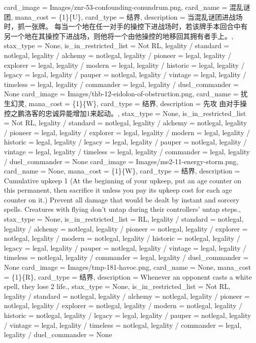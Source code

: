 \documentclass[lang = cn, color = black, 10pt]{AllThatStax}
\begin{document}
\card
{
	card_image = Images/znr-53-confounding-conundrum.png,
	card_name = 混乱谜团,
	mana_cost = \{1\}\{U\},
	card_type = 结界,
	description = 当混乱谜团进战场时，抓一张牌。
	每当一个地在任一对手的操控下进战场时，若该牌手本回合中有另一个地在其操控下进战场，则他将一个由他操控的地移回其拥有者手上。,
	stax_type = None,
	is_in_restricted_list = Not RL,
	legality / standard = notlegal,
	legality / alchemy = notlegal,
	legality / pioneer = legal,
	legality / explorer = legal,
	legality / modern = legal,
	legality / historic = legal,
	legality / legacy = legal,
	legality / pauper = notlegal,
	legality / vintage = legal,
	legality / timeless = legal,
	legality / commander = legal,
	legality / duel_commander = None
}
\card
{
	card_image = Images/thb-12-eidolon-of-obstruction.png,
	card_name = 扰生幻灵,
	mana_cost = \{1\}\{W\},
	card_type = 结界,
	description = 先攻
	由对手操控之鹏洛客的忠诚异能增加{1}来起动。,
	stax_type = None,
	is_in_restricted_list = Not RL,
	legality / standard = notlegal,
	legality / alchemy = notlegal,
	legality / pioneer = legal,
	legality / explorer = legal,
	legality / modern = legal,
	legality / historic = legal,
	legality / legacy = legal,
	legality / pauper = notlegal,
	legality / vintage = legal,
	legality / timeless = legal,
	legality / commander = legal,
	legality / duel_commander = None
}
\card
{
	card_image = Images/me2-11-energy-storm.png,
	card_name = None,
	mana_cost = \{1\}\{W\},
	card_type = 结界,
	description = Cumulative upkeep {1} (At the beginning of your upkeep, put an age counter on this permanent, then sacrifice it unless you pay its upkeep cost for each age counter on it.)
	Prevent all damage that would be dealt by instant and sorcery spells.
	Creatures with flying don't untap during their controllers' untap steps.,
	stax_type = None,
	is_in_restricted_list = RL,
	legality / standard = notlegal,
	legality / alchemy = notlegal,
	legality / pioneer = notlegal,
	legality / explorer = notlegal,
	legality / modern = notlegal,
	legality / historic = notlegal,
	legality / legacy = legal,
	legality / pauper = notlegal,
	legality / vintage = legal,
	legality / timeless = notlegal,
	legality / commander = legal,
	legality / duel_commander = None
}
\card
{
	card_image = Images/tmp-181-havoc.png,
	card_name = None,
	mana_cost = \{1\}\{R\},
	card_type = 结界,
	description = Whenever an opponent casts a white spell, they lose 2 life.,
	stax_type = None,
	is_in_restricted_list = Not RL,
	legality / standard = notlegal,
	legality / alchemy = notlegal,
	legality / pioneer = notlegal,
	legality / explorer = notlegal,
	legality / modern = notlegal,
	legality / historic = notlegal,
	legality / legacy = legal,
	legality / pauper = notlegal,
	legality / vintage = legal,
	legality / timeless = notlegal,
	legality / commander = legal,
	legality / duel_commander = None
}
\end{document}
